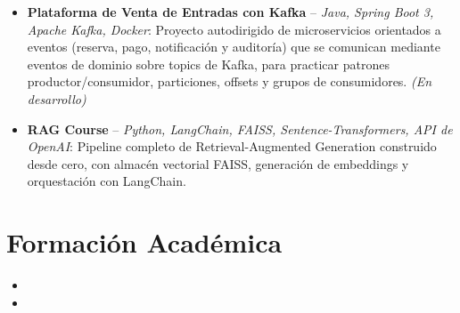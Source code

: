 \documentclass[11pt,a4paper,sans]{moderncv}
\begin{document}
\begin{itemize}
\item \textbf{Plataforma de Venta de Entradas con Kafka} -- \textit{Java, Spring Boot 3, Apache Kafka, Docker}: Proyecto autodirigido de microservicios orientados a eventos (reserva, pago, notificación y auditoría) que se comunican mediante eventos de dominio sobre topics de Kafka, para practicar patrones productor/consumidor, particiones, offsets y grupos de consumidores. \textit{(En desarrollo)}

\item \textbf{RAG Course} -- \textit{Python, LangChain, FAISS, Sentence-Transformers, API de OpenAI}: Pipeline completo de Retrieval-Augmented Generation construido desde cero, con almacén vectorial FAISS, generación de embeddings y orquestación con LangChain.

\end{itemize}


\section{Formación Académica}
\vspace{1pt}
\begin{itemize}

\item{}

\vspace{3pt}

\item{}

\end{itemize}
\end{document}
